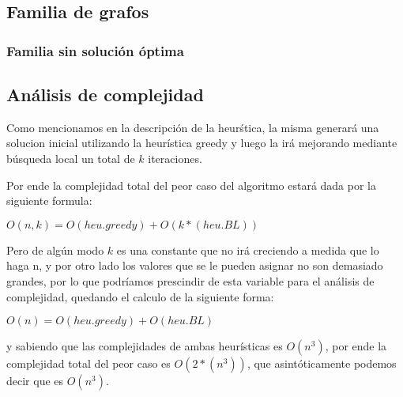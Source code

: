 \subsection{Familia de grafos}
\subsubsection{Familia sin soluci\'on \'optima}

\subsection{An\'alisis de complejidad}
Como mencionamos en la descripci\'on de la heur\'stica, la misma generar\'a una solucion inicial utilizando la heur\'istica greedy y luego la ir\'a mejorando mediante b\'usqueda local un total de $k$ iteraciones. 

Por ende la complejidad total del peor caso del algoritmo estar\'a dada por la siguiente formula:

$O(n,k) = O(heu. greedy) + O(k*(heu. BL))$

Pero de alg\'un modo $k$ es una constante que no ir\'a creciendo a medida que lo haga n, y por otro lado los valores que se le pueden asignar no son demasiado grandes, por lo que podr\'iamos prescindir de esta variable para el an\'alisis de complejidad, quedando el calculo de la siguiente forma:

$O(n) = O(heu. greedy) + O(heu. BL)$

y sabiendo que las complejidades de ambas heur\'isticas es $O(n^3)$, por ende la complejidad total del peor caso es $O(2*(n^3))$, que asint\'oticamente podemos decir que es $O(n^3)$.


